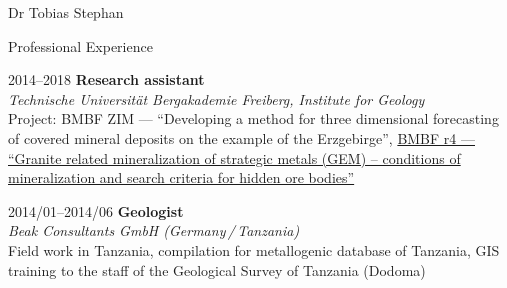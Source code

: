 \documentclass[10pt, paper=letter]{scrartcl} %
\begin{document}
\begin{cv}{Dr Tobias Stephan}
\begin{cvlist}{Professional Experience}
        \item[2014--2018] \textbf{Research assistant}\\
        \textit{Technische Universit\"at Bergakademie Freiberg, Institute for Geology}
        \\ Project: BMBF ZIM --- \enquote{Developing a method for three dimensional forecasting of covered mineral deposits on the example of the Erzgebirge}, \href{https://www.gfz-potsdam.de/en/section/inorganic-and-isotope-geochemistry/projects/prohydrogen-more-mofette-research-prosalz-gramm-sugar-gem-amrep-halmahera-gogaf-irup-spp-sample-ketzin-co2-cosanostra-inkaba-yeafrica-dafgas/gem/bmbf-r4-gem}{BMBF r4 --- \enquote{Granite related mineralization of strategic metals (GEM) – conditions of mineralization and search criteria for hidden ore bodies}}
        \item[2014/01--2014/06] \textbf{Geologist}\\
        \textit{Beak Consultants GmbH (Germany\,/\,Tanzania)}\\
        Field work in Tanzania, compilation for metallogenic database of Tanzania, GIS training to the staff of the Geological Survey of Tanzania (Dodoma)        

\end{cvlist}
\end{cv}
\end{document}
